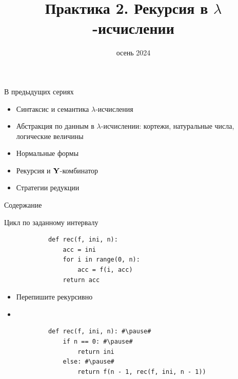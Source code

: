 
\newif\ifhandout




\title[2. Рекурсия в $\lambda$-исчислении]{Практика 2. Рекурсия в $\lambda$-исчислении}
\date{осень 2024}



    \setcounter{framenumber}{-1}
    \maketitle

    \begin{frame}{В предыдущих сериях}
        \begin{itemize}
            \item Синтаксис и семантика $\lambda$-исчисления
            \item Абстракция по данным в $\lambda$-исчислении: кортежи, натуральные числа, логические величины
            \item[\newtopic] Нормальные формы
            \item[\newtopic] Рекурсия и $\mathbf{Y}$-комбинатор
            \item[\newtopic] Стратегии редукции
        \end{itemize}
    \end{frame}

    \begin{frame}[noframenumbering]{Содержание}
        \tableofcontents
    \end{frame}



    \begin{frame}[fragile]{Цикл по заданному интервалу}
        \begin{verbatim}
            def rec(f, ini, n):
                acc = ini
                for i in range(0, n):
                    acc = f(i, acc)
                return acc
        \end{verbatim}
        \begin{itemize}
            \item[\todo] Перепишите рекурсивно
            \item[\answer] \pause
        \end{itemize}
        \begin{verbatim}
            def rec(f, ini, n): #\pause#
                if n == 0: #\pause#
                    return ini
                else: #\pause#
                    return f(n - 1, rec(f, ini, n - 1))
        \end{verbatim}
    \end{frame}

